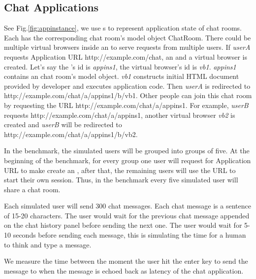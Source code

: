 \clickthroughput{}
\clicklatency{}

\clickwaitthroughput{}
\clickwaitlatency{}

\subsection{Chat Applications}
See Fig.\ref{fig:appinstance},
we use \appins{}s to represent application state of chat rooms.
Each \appins{} has the corresponding chat room's model object ChatRoom.
There could be multiple virtual browsers inside an \appins{} to  
serve requests from multiple users.
If \emph{userA} requests Application URL http://example.com/chat,
an \appins{} and a virtual browser is created.
Let's say the \appins{}'s id is \emph{appins1},
the virtual browser's id is \emph{vb1}.
\emph{appins1} contains an chat room's model object.
\emph{vb1} constructs initial HTML document provided by developer and 
executes application \js{} code.
Then \emph{userA} is redirected to http://example.com/chat/a/appins1/b/vb1.
Other people can join this chat room by requesting the \appins{} URL
http://example.com/chat/a/appins1.
For example, \emph{userB} requests http://example.com/chat/a/appins1,
another virtual browser \emph{vb2} is created and \emph{userB} will be
redirected to http://example.com/chat/a/appins1/b/vb2. 

In the benchmark, 
the simulated users will be grouped into groups of five.
At the beginning of the benchmark, 
for every group one user will request for Application URL to make 
\cb{} create an \appins{},
after that, the remaining users will use the \appins{} URL to start
their own session.
Thus, in the benchmark every five simulated user will share a chat room.

Each simulated user will send 300 chat messages.
Each chat message is a sentence of 15-20 characters.
The user would wait for the previous chat message appended on the chat history
panel before sending the next one.
The user would wait for 5-10 seconds before sending each message,
this is simulating the time for a human to think and type a message.

We measure the time between the moment 
the user hit the enter key to send the message to 
when the message is echoed back as latency of the chat application.



